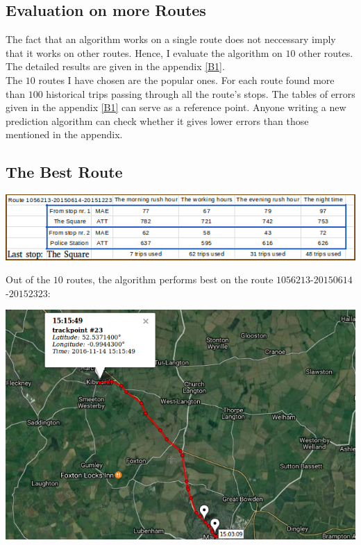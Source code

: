 \documentclass[12pt,a4paper,oneside,openright]{report}
\begin{document}
\subsection{Evaluation on more Routes}

The fact that an algorithm works on a single route does not neccessary imply that
it works on other routes. Hence, I evaluate the algorithm on $10$ other routes. The
detailed results are given in the appendix \ref{B1}. \\

The $10$ routes I have chosen are the popular ones. For each route found
more than $100$ historical trips passing through all the route's stops. The tables of
errors given in the appendix \ref{B1} can serve as a reference point. Anyone writing a
new prediction algorithm can check whether it gives lower errors than those mentioned
in the appendix.

\subsection{The Best Route}

\includegraphics[width=\textwidth]{figs/table_of_1056213.png}

Out of the $10$ routes, the algorithm performs best on the route
$1056213$-$20150614$-$20152323$:

\includegraphics[scale=0.65]{figs/best_route.png}
\end{document}

